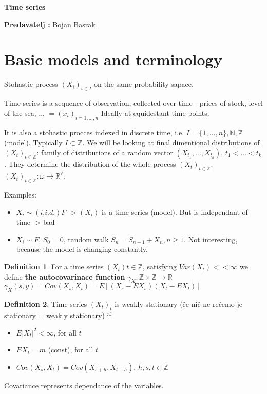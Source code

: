 \documentclass[12pt,a4paper]{amsart}
\theoremstyle{definition} %
\newtheorem{defn}{Definition}[section]
\theoremstyle{plain} %
\newcommand{\R}{\mathbb R}
\newcommand{\N}{\mathbb N}
\newcommand{\Z}{\mathbb Z}
\begin{document}
{\bf \huge Time series}

\vskip1cm

{\bf Predavatelj : } Bojan Basrak



\section{Basic models and terminology}

Stohastic process $(X_i)_{i \in I}$ on the same probability sapace.

Time series is a sequence of observation, collected over time - prices of stock, level of the sea, ... $ =  (x_i)_{i = 1, \dots, n}$
Ideally at equidestant time points. 

It is also a stohastic procces indexed in discrete time, i.e.  $I = \{1, \dots, n\}, \N, \Z$ (model). Typically $I \subset \Z$.
We will be looking at final dimentional distributions of $(X_t)_{t \in \Z}$: family of distributions of a random vector
$(X_{t_1}, \dots, X_{t_k})$, $t_1 < \dots < t_k$.
They determine the distribution of the whole process $(X_t)_{t \in \Z}$.
$(X_t)_{t \in \Z}: \omega \rightarrow \R^{\Z} $.

Examples:

\begin{itemize}
\item $X_i \sim (i.i.d.) F$ -> $(X_i)$ is a time series (model). But is independant of time -> bad
\item $X_i \sim F$, $S_0 = 0$, random walk $S_n = S_{n - 1} + X_n, n\geq 1$. Not interesting, because the model is changing constantly. 
\end{itemize}

\begin{defn}
For a time series $(X_t){t\in \Z}$, satisfying $Var(X_t) < <\infty$ we define {\bf the autocovarinace function} $\gamma_X : \Z \times\Z \rightarrow  \R$
$\gamma_X(s,y) = Cov(X_s, X_t) = E[(X_s - EX_s)(X_t - EX_t)]$
\end{defn}

\begin{defn}
Time series $(X_t)_t$ is weakly stationary (če nič ne rečemo je stationary = weakly stationary) if 
\begin{itemize}
\item $E|X_t|^2 < \infty$, for all $t$
\item $EX_t = m$ (const), for all $t$
\item $Cov(X_s, X_t) = Cov(X_{s+h},X_{t+h})$, $h, s, t \in \Z$
\end{itemize}
Covariance represents dependance of the variables. 
\end{defn}
\end{document}
